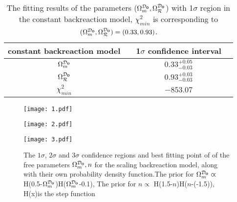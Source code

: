 \documentclass[preprint,preprintnumbers, prd, floatfix,  superscriptaddress,nofootinbib] {revtex4-1}
\newcommand{\CD}{{\cal D}}
\newcommand{\CR}{{\cal R}}
\newcommand{\now}[1]{{#1_{\rm \bf 0}}}
\begin{document}
\begin{table}
\begin{center}
\begin{tabular}{cc|  cc }
\hline\hline constant backreaction model & &  1$\sigma$ confidence interval
\\ \hline
$\Omega_{m}^{\now\CD}$    &&  $0.33_{-0.03}^{+0.05}$
                     \\
$\Omega_{\CR}^{\now\CD}$         &&  $0.93_{-0.03}^{+0.03}$
                     \\
 \hline $\chi^{2}_{min}$  &&  $-853.07$
                      \\
\hline\hline
\end{tabular}
\caption{\label{tab:3} The fitting results of the parameters ($\Omega_{m}^{\now\CD},\Omega_{\CR}^{\now\CD}$) with 1$\sigma$ region in the constant backreaction model, $\chi^{2}_{min}$ is corresponding to $(\Omega_{m}^{\now\CD},\Omega_{\CR}^{\now\CD})=(0.33,0.93)$.}
\end{center}
\end{table}


\begin{figure}
\begin{flushleft}
\begin{minipage}{0.45\linewidth}
  \centerline{\texttt{[image: 1.pdf]}}
\end{minipage}
\hfill
\end{flushleft}

\begin{flushleft}
\begin{minipage}{0.46\linewidth}
  \centerline{\texttt{[image: 2.pdf]}}
\end{minipage}
\hfill
\begin{minipage}{0.45\linewidth}
 \centerline{\texttt{[image: 3.pdf]}}
\end{minipage}
\end{flushleft}

\caption{The $1\sigma$, $2\sigma$ and $3\sigma$ confidence regions and best fitting point of of the free parameters $\Omega_{m}^{\now\CD},n$ for the
 scaling backreaction model, along with their own probability density function.The prior for $\Omega_{m}^{\now\CD}\varpropto $ H(0.5-$\Omega_{m}^{\now\CD}$)H($\Omega_{m}^{\now\CD}$-0.1),
The prior for $n\varpropto$ H(1.5-$n$)H($n$-(-1.5)),
H(x)is the step function}
\label{fig:1}
\end{figure}
\end{document}
